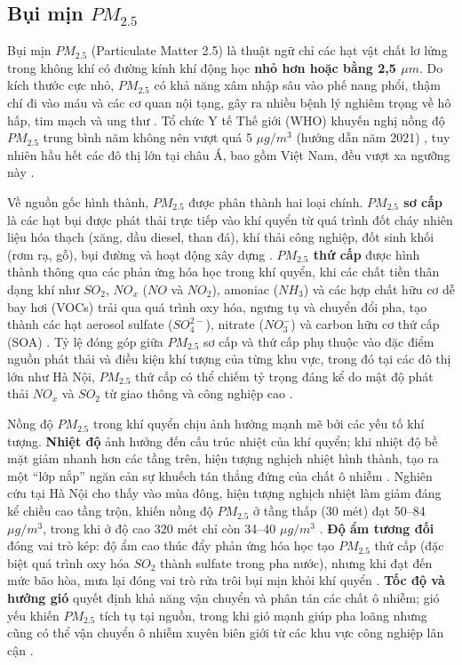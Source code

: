 \subsection{Bụi mịn $PM_{2.5}$}

Bụi mịn $PM_{2.5}$ (Particulate Matter 2.5) là thuật ngữ chỉ các hạt vật chất lơ lửng trong không khí có đường kính khí động học \textbf{nhỏ hơn hoặc bằng 2,5 $\mu m$}. Do kích thước cực nhỏ, $PM_{2.5}$ có khả năng xâm nhập sâu vào phế nang phổi, thậm chí đi vào máu và các cơ quan nội tạng, gây ra nhiều bệnh lý nghiêm trọng về hô hấp, tim mạch và ung thư \cite{le2024environmental}. Tổ chức Y tế Thế giới (WHO) khuyến nghị nồng độ $PM_{2.5}$ trung bình năm không nên vượt quá 5 $\mu g/m^3$ (hướng dẫn năm 2021) \cite{WHO_2021_AQG}, tuy nhiên hầu hết các đô thị lớn tại châu Á, bao gồm Việt Nam, đều vượt xa ngưỡng này \cite{krzyzanowski2014megacities}.

Về nguồn gốc hình thành, $PM_{2.5}$ được phân thành hai loại chính. \textbf{$PM_{2.5}$ sơ cấp} là các hạt bụi được phát thải trực tiếp vào khí quyển từ quá trình đốt cháy nhiên liệu hóa thạch (xăng, dầu diesel, than đá), khí thải công nghiệp, đốt sinh khối (rơm rạ, gỗ), bụi đường và hoạt động xây dựng \cite{ho2025assessment, bui2025urbanization}. \textbf{$PM_{2.5}$ thứ cấp} được hình thành thông qua các phản ứng hóa học trong khí quyển, khi các chất tiền thân dạng khí như $SO_2$, $NO_x$ ($NO$ và $NO_2$), amoniac ($NH_3$) và các hợp chất hữu cơ dễ bay hơi (VOCs) trải qua quá trình oxy hóa, ngưng tụ và chuyển đổi pha, tạo thành các hạt aerosol sulfate ($SO_4^{2-}$), nitrate ($NO_3^{-}$) và carbon hữu cơ thứ cấp (SOA) \cite{le2024environmental}. Tỷ lệ đóng góp giữa $PM_{2.5}$ sơ cấp và thứ cấp phụ thuộc vào đặc điểm nguồn phát thải và điều kiện khí tượng của từng khu vực, trong đó tại các đô thị lớn như Hà Nội, $PM_{2.5}$ thứ cấp có thể chiếm tỷ trọng đáng kể do mật độ phát thải $NO_x$ và $SO_2$ từ giao thông và công nghiệp cao \cite{ho2025assessment}.

Nồng độ $PM_{2.5}$ trong khí quyển chịu ảnh hưởng mạnh mẽ bởi các yếu tố khí tượng. \textbf{Nhiệt độ} ảnh hưởng đến cấu trúc nhiệt của khí quyển; khi nhiệt độ bề mặt giảm nhanh hơn các tầng trên, hiện tượng nghịch nhiệt hình thành, tạo ra một ``lớp nắp'' ngăn cản sự khuếch tán thẳng đứng của chất ô nhiễm \cite{dam2024pm25}. Nghiên cứu tại Hà Nội cho thấy vào mùa đông, hiện tượng nghịch nhiệt làm giảm đáng kể chiều cao tầng trộn, khiến nồng độ $PM_{2.5}$ ở tầng thấp (30 mét) đạt 50--84 $\mu g/m^3$, trong khi ở độ cao 320 mét chỉ còn 34--40 $\mu g/m^3$ \cite{dam2024pm25, nguyen2024cmaq}. \textbf{Độ ẩm tương đối} đóng vai trò kép: độ ẩm cao thúc đẩy phản ứng hóa học tạo $PM_{2.5}$ thứ cấp (đặc biệt quá trình oxy hóa $SO_2$ thành sulfate trong pha nước), nhưng khi đạt đến mức bão hòa, mưa lại đóng vai trò rửa trôi bụi mịn khỏi khí quyển \cite{dam2024pm25}. \textbf{Tốc độ và hướng gió} quyết định khả năng vận chuyển và phân tán các chất ô nhiễm; gió yếu khiến $PM_{2.5}$ tích tụ tại nguồn, trong khi gió mạnh giúp pha loãng nhưng cũng có thể vận chuyển ô nhiễm xuyên biên giới từ các khu vực công nghiệp lân cận \cite{ho2025assessment}.

